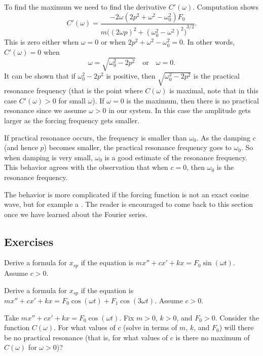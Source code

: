 To find the maximum we need to find the derivative $C'(\omega)$.
Computation shows
\begin{equation*}
C'(\omega) =
\frac{- 2\omega( 2p^2+\omega^2-\omega_0^2)F_0}
{m {\bigl({(2\omega p)}^2+{(\omega_0^2-\omega^2)}^2\bigr)}^{3/2}} .
\end{equation*}
This is zero either when $\omega = 0$ or when
$2p^2+\omega^2-\omega_0^2 = 0$.  In other words, $C'(\omega) = 0$ when
\begin{equation*}
\boxed{
~~
\omega = \sqrt{\omega_0^2 - 2p^2} \quad \text{or} \quad \omega = 0 .
~~
}
\end{equation*}
It can be shown that if 
$\omega_0^2 - 2p^2$ is positive, then 
$\sqrt{\omega_0^2 - 2p^2}$ is the practical resonance frequency (that is the
point where $C(\omega)$ is maximal, note that in this case $C'(\omega) > 0$
for small $\omega$).  If $\omega=0$ is the maximum, then
there is no practical resonance since we assume $\omega > 0$
in our system.  In this case the amplitude gets larger as the forcing
frequency gets smaller.

If practical resonance occurs, the frequency is smaller than
$\omega_0$.  As the damping $c$ (and hence $p$) becomes smaller, the
practical resonance frequency
goes to $\omega_0$.  So when damping is very
small, $\omega_0$ is a good estimate of the resonance frequency.  This
behavior
agrees with the observation that when $c=0$, then $\omega_0$ is the resonance
frequency.

The behavior is more complicated if the forcing function is not an
exact cosine wave, but for example a .
The reader is encouraged to come
back to this section once we have learned about the Fourier series.

\subsection{Exercises}

\begin{exercise}
Derive a formula for $x_{sp}$ if the equation is
$m x'' + c x' + kx = F_0 \sin (\omega t)$.  Assume $c > 0$.
\end{exercise}

\begin{exercise}
Derive a formula for $x_{sp}$ if the equation is
$m x'' + c x' + kx = F_0 \cos (\omega t) + F_1 \cos (3\omega t)$.
Assume $c > 0$.
\end{exercise}

\begin{exercise}
Take $m x'' + c x' + kx = F_0 \cos (\omega t)$.
Fix $m > 0$, $k > 0$, and $F_0 > 0$.  Consider the function $C(\omega)$.
For what values of $c$ (solve in terms of $m$, $k$, and $F_0$) will there be no
practical resonance (that is, for what values of $c$ is there no maximum of
$C(\omega)$ for $\omega > 0$)?
\end{exercise}

